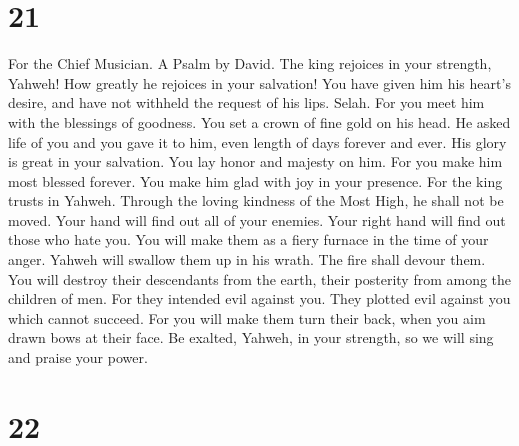 \hypertarget{section-20}{%
\section{21}\label{section-20}}

For the Chief Musician. A Psalm by David.  The king rejoices
in your strength, Yahweh! How greatly he rejoices in your salvation!
 You have given him his heart's desire, and have not
withheld the request of his lips. Selah.  For you meet him
with the blessings of goodness. You set a crown of fine gold on his
head.  He asked life of you and you gave it to him, even
length of days forever and ever.  His glory is great in your
salvation. You lay honor and majesty on him.  For you make
him most blessed forever. You make him glad with joy in your presence.
 For the king trusts in Yahweh. Through the loving kindness
of the Most High, he shall not be moved.  Your hand will
find out all of your enemies. Your right hand will find out those who
hate you.  You will make them as a fiery furnace in the time
of your anger. Yahweh will swallow them up in his wrath. The fire shall
devour them.  You will destroy their descendants from the
earth, their posterity from among the children of men.  For
they intended evil against you. They plotted evil against you which
cannot succeed.  For you will make them turn their back,
when you aim drawn bows at their face.  Be exalted, Yahweh,
in your strength, so we will sing and praise your power.

\hypertarget{section-21}{%
\section{22}\label{section-21}}

